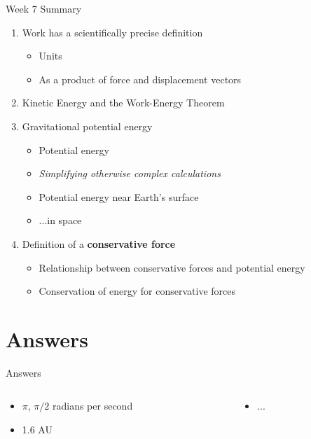 \documentclass{beamer}
\begin{document}
\begin{frame}{Week 7 Summary}
\begin{enumerate}
\item \alert{Work} has a scientifically precise definition
\begin{itemize}
\item Units
\item As a product of force and displacement vectors
\end{itemize}
\item Kinetic Energy and the \alert{Work-Energy Theorem}
\item Gravitational potential energy
\begin{itemize}
\item Potential energy
\item \textit{Simplifying otherwise complex calculations}
\item Potential energy near Earth's surface
\item ...in space
\end{itemize}
\item Definition of a \textbf{conservative force}
\begin{itemize}
\item Relationship between conservative forces and potential energy
\item Conservation of energy for conservative forces
\end{itemize}
\end{enumerate}
\end{frame}

\section{Answers}

\begin{frame}{Answers}
\begin{columns}[T]
\begin{column}{0.5\textwidth}
\begin{itemize}
\item $\pi$, $\pi/2$ radians per second
\item 1.6 AU
\end{itemize}
\end{column}
\begin{column}{0.5\textwidth}
\begin{itemize}
\item ... 
\end{itemize}
\end{column}
\end{columns}
\end{frame}
\end{document}

